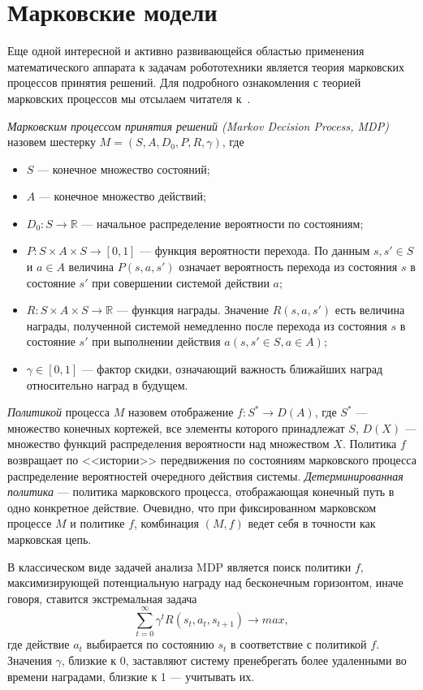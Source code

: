 \documentclass[conference]{IEEEtran}
\begin{document}
\section{Марковские модели}
Еще одной интересной и активно развивающейся областью применения математического 
аппарата к задачам робототехники является теория марковских процессов принятия 
решений. Для подробного ознакомления с теорией марковских процессов мы отсылаем 
читателя к~\cite{beranek1961ronald}.

\textit{Марковским процессом принятия решений (Markov Decision Process, MDP)} 
назовем шестерку $M = (S, A, D_0, P, R, \gamma)$, где
\begin{itemize}
  \item $S$ --- конечное множество состояний;
  \item $A$ --- конечное множество действий;
  \item $D_0: S\rightarrow\mathbb{R}$ --- начальное распределение вероятности по состояниям;
  \item $P: S\times{A}\times{S}\rightarrow[0,1]$ --- функция вероятности перехода. 
    По данным $s, s' \in S$ и $a \in A$ величина $P(s,a,s')$ означает вероятность 
    перехода из состояния $s$ в состояние $s'$ при совершении системой действии $a$;
  \item $R: S\times{A}\times{S}\rightarrow\mathbb{R}$ --- функция награды. Значение 
    $R(s,a,s')$ есть величина награды, полученной системой немедленно после 
    перехода из состояния $s$ в состояние $s'$ при выполнении действия 
    $a (s,s' \in S, a \in A)$;
  \item $\gamma \in [0,1]$ --- фактор скидки, означающий важность ближайших 
    наград относительно наград в будущем.
\end{itemize}

\textit{Политикой} процесса $M$ назовем отображение $f: S^*\rightarrow{D}(A)$, где 
$S^*$ --- множество конечных кортежей, все элементы которого принадлежат $S$, 
$D(X)$ --- множество функций распределения вероятности над множеством $X$. 
Политика $f$ возвращает по <<истории>> передвижения по состояниям марковского 
процесса распределение вероятностей очередного действия системы. 
\textit{Детерминированная политика} --- политика марковского процесса, отображающая 
конечный путь в одно конкретное действие. Очевидно, что при фиксированном 
марковском процессе $M$ и политике $f$, комбинация $(M, f)$ ведет себя в точности 
как марковская цепь.

В классическом виде задачей анализа MDP является поиск политики $f$, 
максимизирующей потенциальную награду над бесконечным горизонтом, иначе говоря, 
ставится экстремальная задача
$$\sum\limits_{t=0}^\infty\gamma^t R(s_t, a_t, s_{t+1})\rightarrow{}max,$$
где действие $a_t$ выбирается по состоянию $s_t$ в соответствие с политикой $f$. 
Значения $\gamma$, близкие к 0, заставляют систему пренебрегать более удаленными 
во времени наградами, близкие к 1 --- учитывать их.
\end{document}
